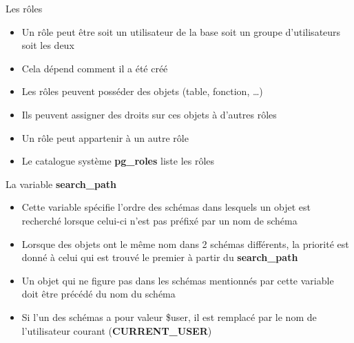 
\begin{frame}[fragile]{Les rôles}

   \begin{itemize}
      \item Un rôle peut être soit un utilisateur de la base soit un groupe d'utilisateurs soit les deux
      \item Cela dépend comment il a été créé
      \item Les rôles peuvent posséder des objets (table, fonction, \ldots)
      \item Ils peuvent assigner des droits sur ces objets à d'autres rôles
      \item Un rôle peut appartenir à un autre rôle
      \item Le catalogue système \textbf{pg\_roles} liste les rôles
   \end{itemize}

\begin{toile}
\end{toile}

\end{frame}


\begin{frame}[fragile]{La variable \textbf{search\_path}}

   \begin{itemize}
      \item Cette variable spécifie l'ordre des schémas dans lesquels un objet est recherché lorsque celui-ci n'est pas préfixé par un nom de schéma
      \item Lorsque des objets ont le même nom dans 2 schémas différents, la priorité est donné à celui qui est trouvé le premier à partir du \textbf{search\_path}
      \item Un objet qui ne figure pas dans les schémas mentionnés par cette variable doit être précédé du nom du schéma
      \item Si l'un des schémas a pour valeur \$user, il est remplacé par le nom de l'utilisateur courant (\textbf{CURRENT\_USER})
   \end{itemize}

\begin{toile}
\end{toile}

\end{frame}


